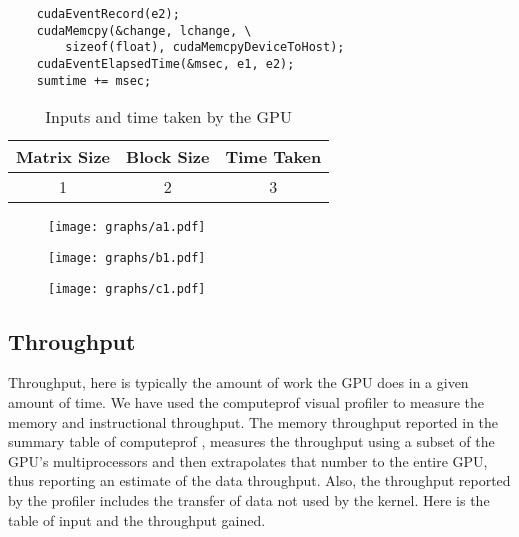 \documentclass[10pt]{article}
\begin{document}
\begin{multicols}{2}
\begin{enumerate}
    \begin{verbatim}
    cudaEventRecord(e2);
    cudaMemcpy(&change, lchange, \
        sizeof(float), cudaMemcpyDeviceToHost);
    cudaEventElapsedTime(&msec, e1, e2);
    sumtime += msec;
    \end{verbatim}

    \end{enumerate}

    \begin{table}\footnotesize
    \centering
        \begin{tabular}{ | c | c | c | }
        \hline
        Matrix Size & Block Size & Time Taken \\
        \hline
        1 & 2 & 3 \\
        \hline
        \end{tabular}
        \caption{Inputs and time taken by the GPU}
        \label{tab:inputs_time_taken}
    \end{table}

    \begin{figure*}
        \centering
        \texttt{[image: graphs/a1.pdf]}
        \caption{}
        \label{fig:time_taken1}
    \end{figure*}
    
    \begin{figure*}
        \centering
        \texttt{[image: graphs/b1.pdf]}
        \caption{}
        \label{fig:time_taken2}
    \end{figure*}

    \begin{figure*}
        \centering
        \texttt{[image: graphs/c1.pdf]}
        \caption{}
        \label{fig:time_taken3}
    \end{figure*}

    \subsection{Throughput}
    Throughput, here is typically the amount of work the GPU does in a given amount of time.
    We have used the computeprof visual profiler to measure the memory and instructional throughput.
    The memory throughput reported in the summary table of computeprof ,  measures  the throughput using a subset of the GPU’s multiprocessors and then extrapolates that number to the entire GPU, thus reporting an estimate of the data throughput.
    Also, the throughput reported by the profiler includes the transfer of data not used by the kernel.
    Here is the table of input and the throughput gained.


\end{multicols}
\end{document}
